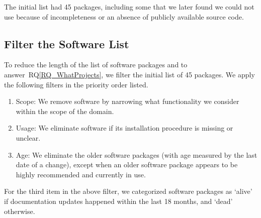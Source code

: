 \documentclass[final, 3p, times, authoryear]{elsarticle}
\newcommand{\rqref}[1]{RQ\ref{#1}}
\begin{document}
The initial list had 45 packages, including some that we later found we could
not use because of incompleteness or an absence of publicly available source
code.

\subsection{Filter the Software List} \label{filtersoftware}

To reduce the length of the list of software packages and to
answer~\rqref{RQ_WhatProjects}, we filter the initial list of 45 packages. We
apply the following filters in the priority order listed. 

\begin{enumerate}
	\item Scope: We remove software by narrowing what functionality we
    consider within the scope of the domain.
	\item Usage: We eliminate software if its installation procedure is
	missing or unclear.
	\item Age: We eliminate the older software packages (with age measured by
	the last date of a change), except when an older software package appears to
	be highly recommended and currently in use. 
\end{enumerate}

For the third item in the above filter, we categorized software packages as
`alive' if documentation updates happened within the last 18 months, and `dead'
otherwise. 
\end{document}
